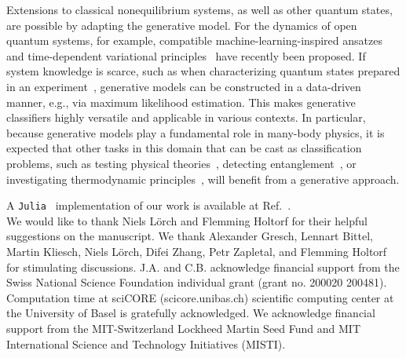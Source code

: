 \documentclass[twocolumn,aps,prl,superscriptaddress,tightlines,nofootinbib]{revtex4-2}
\begin{document}
Extensions to classical nonequilibrium systems, as well as other quantum states, are possible by adapting the generative model. For the dynamics of open quantum systems, for example, compatible machine-learning-inspired ansatzes~\cite{luo:2022} and time-dependent variational principles~\cite{reh:2021} have recently been proposed. If system knowledge is scarce, such as when characterizing quantum states prepared in an experiment~\cite{carrasquilla:2019,gomez:2022}, generative models can be constructed in a data-driven manner, e.g., via maximum likelihood estimation. This makes generative classifiers highly versatile and applicable in various contexts. In particular, because generative models play a fundamental role in many-body physics, it is expected that other tasks in this domain that can be cast as classification problems, such as testing physical theories~\cite{bohrdt:2019,zhang2:2019,munoz:2021}, detecting entanglement~\cite{lu:2018}, or investigating thermodynamic principles~\cite{seif:2021}, will benefit from a generative approach. 

\indent A \texttt{Julia}~\cite{bezanson:2012} implementation of our work is available at Ref.~\cite{github}.\\

\indent We would like to thank Niels Lörch and Flemming Holtorf for their helpful suggestions on the manuscript. We thank Alexander Gresch, Lennart Bittel, Martin Kliesch, Niels Lörch, Difei Zhang, Petr Zapletal, and Flemming Holtorf for stimulating discussions. J.A. and C.B. acknowledge financial support from the Swiss National Science Foundation individual grant (grant no. 200020 200481). Computation time at sciCORE (scicore.unibas.ch) scientific computing center at the University of Basel is gratefully acknowledged. We acknowledge financial support from the MIT-Switzerland Lockheed Martin Seed Fund and MIT International Science and Technology Initiatives (MISTI).


\end{document}
